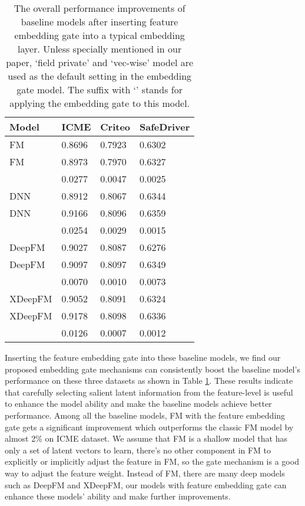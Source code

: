 \documentclass[sigconf,nonacm=true]{acmart}
\begin{document}
\begin{table}[ht]
  \centering
  \caption{The overall performance improvements of baseline models after inserting feature embedding gate into a typical embedding layer. Unless specially mentioned in our paper, `field private' and `vec-wise' model are used as the default setting in the embedding gate model. The suffix with `' stands for applying the embedding gate to this model.}
  \label{table:t1}
  \begin{tabular}{llll}
  Model & ICME & Criteo & SafeDriver \\ \hline
  FM & 0.8696 & 0.7923 & 0.6302 \\
  FM & 0.8973 & 0.7970 & 0.6327 \\
   & 0.0277 & 0.0047 & 0.0025 \\ \hline
  DNN & 0.8912 & 0.8067 & 0.6344 \\
  DNN  & 0.9166 & 0.8096 & 0.6359 \\
   & 0.0254 & 0.0029 & 0.0015 \\ \hline
  DeepFM & 0.9027 & 0.8087 & 0.6276 \\
  DeepFM  & 0.9097 & 0.8097 & 0.6349 \\
   & 0.0070 & 0.0010 & 0.0073 \\ \hline
  XDeepFM & 0.9052 & 0.8091 & 0.6324 \\
  XDeepFM  & 0.9178 & 0.8098 & 0.6336 \\
   & 0.0126 & 0.0007 & 0.0012 \tabularnewline \bottomrule
  \end{tabular}
\end{table}

Inserting the feature embedding gate into these baseline models, we find our proposed embedding gate mechanisms can  consistently boost the baseline model's performance on these three datasets as shown in Table \ref{table:t1}. 
These results indicate that carefully selecting salient latent information from the feature-level is useful to enhance the model ability and make the baseline models achieve better performance.
Among all the baseline models, FM with the feature embedding gate gets a significant improvement which outperforms the classic FM model by almost 2\% on ICME dataset.
We assume that FM is a shallow model that has only a set of latent vectors to learn, 
there's no other component in FM to explicitly or implicitly adjust the feature in FM, 
so the gate mechanism is a good way to adjust the feature weight. 
Instead of FM, there are many deep models such as DeepFM and XDeepFM, our models with feature embedding gate can enhance these models' ability and make further improvements.
\end{document}

